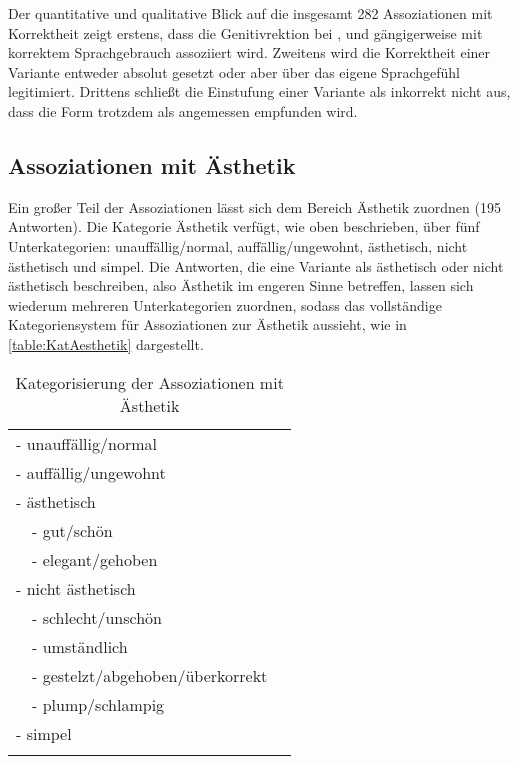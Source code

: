 Der quantitative und qualitative Blick auf die insgesamt 282 Assoziationen mit Korrektheit zeigt erstens, dass die Genitivrektion bei \wegen, \waehrend{} und \dank{} gängigerweise mit korrektem Sprachgebrauch assoziiert wird. 
Zweitens wird die Korrektheit einer Variante entweder absolut gesetzt oder aber über das eigene Sprachgefühl legitimiert. 
Drittens schließt die Einstufung einer Variante als inkorrekt nicht aus, dass die Form trotzdem als angemessen empfunden wird. 
\subsection{Assoziationen mit Ästhetik}
\label{sec:ErgAssAes}
\begin{sloppypar}
Ein großer Teil der Assoziationen lässt sich dem Bereich Ästhetik zuordnen (195 Antworten). 
Die Kategorie \glqq Ästhetik\grqq{} verfügt, wie oben beschrieben, über fünf Unterkategorien: \glqq unauffällig\slash normal\grqq, \glqq auffällig\slash ungewohnt\grqq, \glqq ästhetisch\grqq, \glqq nicht ästhetisch\grqq{} und \glqq simpel\grqq. 
Die Antworten, die eine Variante als \glqq ästhetisch\grqq{} oder \glqq nicht ästhetisch\grqq{} beschreiben, also Ästhetik im engeren Sinne betreffen, lassen sich wiederum mehreren Unterkategorien zuordnen, sodass das vollständige Kategoriensystem für Assoziationen zur Ästhetik aussieht, wie in \autoref{table:KatAesthetik} dargestellt.  
\end{sloppypar}

\begin{table}
\centering
\begin{tabular}{lll}
\lsptoprule
\multicolumn{2}{l}{Ästhetik} \\
\midrule
\multicolumn{2}{l}{- unauffällig/normal} \\
\multicolumn{2}{l}{- auffällig/ungewohnt} \\
\multicolumn{2}{l}{- ästhetisch} \\
 & - gut/schön \\ 
 & - elegant/gehoben \\
\multicolumn{2}{l}{- nicht ästhetisch} \\
 & - schlecht/unschön \\ 
 & - umständlich \\ 
 & - gestelzt/abgehoben/überkorrekt\\
 & - plump/schlampig \\ \hline
\multicolumn{2}{l}{- simpel}\\ 
\lspbottomrule
\end{tabular}
\caption{Kategorisierung der Assoziationen mit Ästhetik}
\label{table:KatAesthetik}
\end{table}

